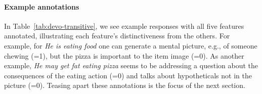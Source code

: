 \paragraph{Example annotations}

In Table~\ref{tab:devo-transitive}, we see example responses with all five features annotated, illustrating each feature's distinctiveness from the others.  For example, for \textit{He is eating food} one can generate a mental picture, e.g., of someone chewing (=1), but the pizza is important to the item image (=0).  As another example, \textit{He may get fat eating pizza} seems to be addressing a question about the consequences of the eating action (=0) and talks about hypotheticals not in the picture (=0).
Teasing apart these annotations is the focus of the next section.

